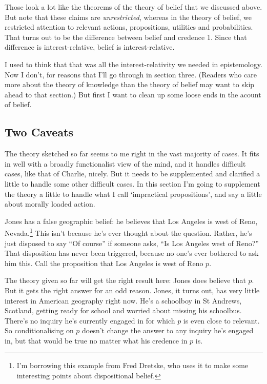 \documentclass[11pt,oneside]{book}
\begin{document}
\noindent Those look a lot like the theorems of the theory of belief that we discussed above. But note that these claims are \textit{unrestricted}, whereas in the theory of belief, we restricted attention to relevant actions, propositions, utilities and probabilities. That turns out to be the difference between belief and credence 1. Since that difference is interest-relative, belief is interest-relative.

I used to think that that was all the interest-relativity we needed in epistemology. Now I don't, for reasons that I'll go through in section three. (Readers who care more about the theory of knowledge than the theory of belief may want to skip ahead to that section.) But first I want to clean up some loose ends in the acount of belief.

\subsection{Two Caveats}
The theory sketched so far seems to me right in the vast majority of cases. It fits in well with a broadly functionalist view of the mind, and it handles difficult cases, like that of Charlie, nicely. But it needs to be supplemented and clarified a little to handle some other difficult cases. In this section I'm going to supplement the theory a little to handle what I call `impractical propositions', and say a little about morally loaded action.

Jones has a false geographic belief: he believes that Los Angeles is west of Reno, Nevada.\footnote{I'm borrowing this example from Fred Dretske, who uses it to make some interesting points about dispositional belief.} This isn't because he's ever thought about the question. Rather, he's just disposed to say ``Of course'' if someone asks, ``Is Los Angeles west of Reno?'' That disposition has never been triggered, because no one's ever bothered to ask him this. Call the proposition that Los Angeles is west of Reno $p$. 

The theory given so far will get the right result here: Jones does believe that $p$. But it gets the right answer for an odd reason. Jones, it turns out, has very little interest in American geography right now. He's a schoolboy in St Andrews, Scotland, getting ready for school and worried about missing his schoolbus. There's no inquiry he's currently engaged in for which $p$ is even close to relevant. So conditionalising on $p$ doesn't change the answer to any inquiry he's engaged in, but that would be true no matter what his credence in $p$ is.
\end{document}
